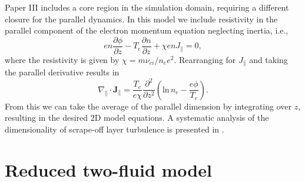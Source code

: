 Paper III includes a core region in the simulation domain, requiring a different closure for the parallel dynamics. In this model we include resistivity in the parallel component of the electron momentum equation neglecting inertia, i.e.,
\begin{equation}\label{par}
	en\frac{\partial\phi}{\partial z} - T_e\frac{\partial n}{\partial z} + \chi enJ_\parallel=0,
\end{equation}
where the resistivity is given by $\chi = m\nu_{ei}/n_e e^2$. %
Rearranging  for $J_\parallel$ and taking the parallel derivative results in \cite{bellan2008fundamentals,meyer_thesis}
\begin{equation}\label{resistivity}
	\nabla_\parallel \cdot \textbf{J}_\parallel = \frac{T_e}{e\chi}\frac{\partial^2}{\partial z^2}\left(\mathrm{ln}\,n_e - \frac{e\phi}{T_e}\right).
\end{equation}
From this we can take the average of the parallel dimension by integrating over $z$, resulting in the desired 2D model equations. A systematic analysis of the dimensionality of scrape-off layer turbulence is presented in \cite{nicholas_dim,Nicholas2021comparing}.

\section{Reduced two-fluid model}

